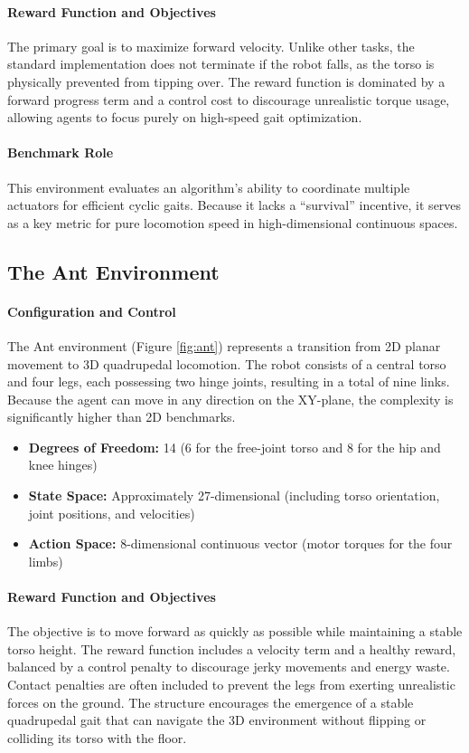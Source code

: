 \paragraph{Reward Function and Objectives} 
The primary goal is to maximize forward velocity. Unlike other tasks, the standard implementation does not terminate if the robot falls, as the torso is physically prevented from tipping over. The reward function is dominated by a forward progress term and a control cost to discourage unrealistic torque usage, allowing agents to focus purely on high-speed gait optimization.

\paragraph{Benchmark Role} 
This environment evaluates an algorithm's ability to coordinate multiple actuators for efficient cyclic gaits. Because it lacks a ``survival'' incentive, it serves as a key metric for pure locomotion speed in high-dimensional continuous spaces.
%

\subsection{The Ant Environment}

\paragraph{Configuration and Control} 
The Ant environment (Figure \ref{fig:ant}) represents a transition from 2D planar movement to 3D quadrupedal locomotion. The robot consists of a central torso and four legs, each possessing two hinge joints, resulting in a total of nine links. Because the agent can move in any direction on the XY-plane, the complexity is significantly higher than 2D benchmarks.

\begin{itemize}
    \item \textbf{Degrees of Freedom:} 14 (6 for the free-joint torso and 8 for the hip and knee hinges)
    \item \textbf{State Space:} Approximately 27-dimensional (including torso orientation, joint positions, and velocities)
    \item \textbf{Action Space:} 8-dimensional continuous vector (motor torques for the four limbs)
\end{itemize}

\paragraph{Reward Function and Objectives} 
The objective is to move forward as quickly as possible while maintaining a stable torso height. The reward function includes a velocity term and a healthy reward, balanced by a control penalty to discourage jerky movements and energy waste. Contact penalties are often included to prevent the legs from exerting unrealistic forces on the ground. The structure encourages the emergence of a stable quadrupedal gait that can navigate the 3D environment without flipping or colliding its torso with the floor.

